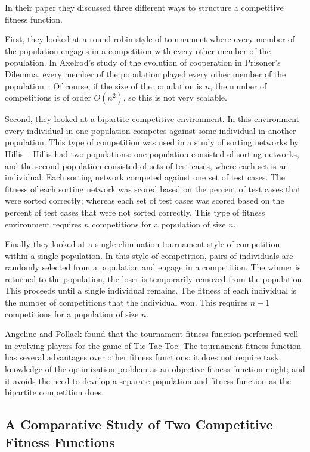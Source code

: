 In their paper they discussed three different ways to structure a competitive
fitness function.

First, they looked at a round robin style of tournament where every member of
the population engages in a competition with every other member of the
population. In Axelrod's study of the evolution of cooperation in Prisoner's
Dilemma, every member of the population played every other member of the
population~\cite{Axelrod1984}. Of course, if the size of the population is
\(n\), the number of competitions is of order \(O(n^2)\), so this is not very
scalable.

Second, they looked at a bipartite competitive environment. In this environment
every individual in one population competes against some individual in another
population. This type of competition was used in a study of sorting networks by
Hillis~\cite{Hillis:1990:CPI:87498.87560}. Hillis had two populations: one
population consisted of sorting networks, and the second population consisted of
sets of test cases, where each set is an individual. Each sorting network
competed against one set of test cases. The fitness of each sorting network was
scored based on the percent of test cases that were sorted correctly; whereas
each set of test cases was scored based on the percent of test cases that were
not sorted correctly. This type of fitness environment requires \(n\)
competitions for a population of size \(n\).

Finally they looked at a single elimination tournament style of competition
within a single population. In this style of competition, pairs of individuals
are randomly selected from a population and engage in a competition.
The winner is returned to the population, the loser is temporarily removed from
the population. This proceeds until a single individual remains. The fitness of
each individual is the number of competitions that the individual won. This
requires \(n-1\) competitions for a population of size \(n\).

Angeline and Pollack found that the tournament fitness function performed well
in evolving players for the game of Tic-Tac-Toe. The tournament fitness function
has several advantages over other fitness functions: it does not require task
knowledge of the optimization problem as an objective fitness function might;
and it avoids the need to develop a separate population and fitness function as
the bipartite competition does.

\subsection{A Comparative Study of Two Competitive Fitness Functions}

